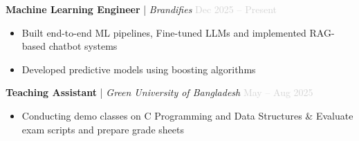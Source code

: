 \documentclass[a4paper,10pt]{article}
\begin{document}
\textbf{Machine Learning Engineer} | \textit{Brandifies} \hfill \textcolor{lightgray}{Dec 2025 -- Present}
\begin{itemize}
    \item Built end-to-end ML pipelines, Fine-tuned LLMs and implemented RAG-based chatbot systems
    \item Developed predictive models using boosting algorithms
\end{itemize}


\textbf{Teaching Assistant} | \textit{Green University of Bangladesh} \hfill \textcolor{lightgray}{May -- Aug 2025}
\begin{itemize}
    \item Conducting demo classes on C Programming and Data Structures \& Evaluate exam scripts and prepare grade sheets
\end{itemize}


\vspace{0.1cm}



\end{document}
